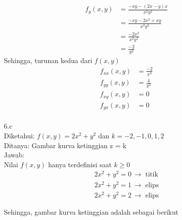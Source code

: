 \documentclass{article}
\begin{document}
    \begin{displaymath}
        \begin{split}
            f_y(x, y) &= \frac{-xy - (2x - y)x}{x^2y^2} \\
            &= \frac{-xy -2x^2 + xy}{x^2y^2} \\
            &= \frac{-2x^2}{x^2y^2} \\
            &= \frac{-2}{y^2}
        \end{split}
    \end{displaymath}
    Sehingga, turunan kedua dari \(f(x, y)\)
    \begin{displaymath}
        \begin{split}
            f_{xx}(x, y) &= \frac{-2}{x^3} \\
            f_{yy}(x, y) &= \frac{4}{y^3} \\
            f_{xy}(x, y) &= 0 \\
            f_{yx}(x, y) &= 0 \\
        \end{split}
    \end{displaymath}

    6.c \\
    Diketahui: \(f(x, y) = 2x^2 + y^2\) dan \(k = -2, -1, 0, 1, 2\) \\
    Ditanya: Gambar kurva ketinggian z = k \\
    Jawab: \\
    Nilai \(f(x, y)\) hanya terdefinisi saat \(k \geq 0\) \\
    \begin{displaymath}
        \begin{split}
            2x^2 + y^2 = 0 \, \rightarrow \text{ titik} \\
            2x^2 + y^2 = 1 \, \rightarrow \text{ elips} \\
            2x^2 + y^2 = 2 \, \rightarrow \text{ elips}
        \end{split}
    \end{displaymath}

    Sehingga, gambar kurva ketinggian adalah sebagai berikut
\end{document}
